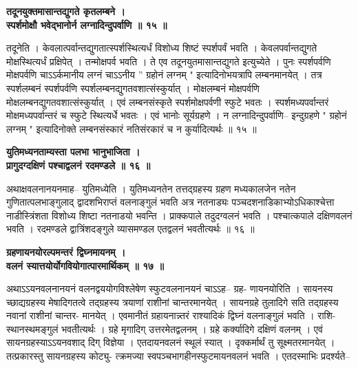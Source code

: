 \documentclass[11pt, openany]{book}
\begin{document}
{{{{\vspace{2mm}
\centering
\textbf{
\hspace{-2.3cm}
 तदूनयुक्तमासान्तद्युगते कृतलम्बने ।\\
 स्पर्शमोक्षौ भवेद्भानोर्न लग्नादिन्दुपर्वाणि ॥ १५ ॥}

\vspace{2mm}
\justifying
 तदूनेति । केवलात्पर्वान्तद्युगतात्स्पर्शस्थित्यर्धं विशोध्य शिष्टं
स्पर्शपर्वं
भवति । केवलपर्वान्तद्युगते मोक्षस्थित्यर्धं प्रक्षिपेत् ।
तन्मोक्षपर्व भवति । ते एव
तदूनयुतमासान्तद्युगते इत्युच्येते । पुनः स्पर्शपर्वणि मोक्षपर्वणि
चाऽऽर्कमानीय
लग्नं चाऽऽनीय '' ग्रहोनं लग्नम् " इत्यादिनोभयत्रापि लम्बनमानयेत् ।
तत्र
स्पर्शलम्बनं स्पर्शपर्वणि स्पर्शलम्बनद्युगतवशात्संस्कुर्यात् ।
मोक्षलम्बनं
मोक्षपर्वणि मोक्षलम्बनद्युगतवशात्संस्कुर्यात् । एवं लम्बनसंस्कृते
स्पर्शमोक्षपर्वणी
स्फुटे भवतः । स्पर्शमध्यपर्वान्तरं  मोक्षमध्यपर्वान्तरं  च
स्फुटे
स्थित्यर्धे भवतः । एवं भानोः सूर्यग्रहणे । न लग्नादिन्दुपर्वाणि--
इन्दुग्रहणे
 " ग्रहोनं लग्नम् " इत्यादिनोक्ते लम्बनसंस्कारं नतिसंरकारं च न कुर्यादित्यर्थः ॥ १५ ॥

\newpage
\thispagestyle{fancy}
\fancyhf{}
\lhead{[ग्रहणाधिकारः]}
\centering
\textbf{
\hspace{-0.5cm}
 युतिमध्यनताम्यस्ता पलभा भानुभाजिता ।\\
 प्रागुदग्दक्षिणं पश्चाद्वलनं रदमण्डले ॥ १६ ॥}

\vspace{2mm}
\justifying
 अथाक्षवलनानयनमाह-- युतिमध्येति । युतिमध्यनतेन तत्तद्ग्रहस्य
ग्रहण
मध्यकालजेन नतेन गुणितात्पलभाङ्गुलाद् द्वादशभिराप्तं वलनाङ्गुलं भवति
अत्र नतनाड्यः पञ्चदशनाडिकाभ्योऽधिकाश्चेत्ता नाडीस्त्रिंशता विशोध्य
शिष्टा
नतनाडयो भवन्ति । प्राक्कपाले तदुदग्वलनं भवति । पश्चात्कपाले
दक्षिणवलनं
भवति । रदमण्डले द्वात्रिंशदङ्गुले व्यासमण्डल एतद्वलनं भवतीत्यर्थः ॥
१६ ॥

\vspace{2mm}
\centering
\textbf{
\hspace{-2cm}
 ग्रहणायनयोरल्पमन्तरं द्विघ्नमायनम् ।\\
 वलनं स्यात्तयोर्योगवियोगात्पारमार्थिकम् ॥ १७ ॥}

\vspace{2mm}
\justifying
 अथाऽऽयनवलनानयनं वलनद्वययोगविश्लेषेण स्फुटवलनानयनं चाऽऽह-- ग्रह-
णायनयोरिति । सायनस्य च्छाद्यग्रहस्य मेषादिगतत्वे तद्ग्रहस्य त्रयाणां
राशीनां
चान्तरमानयेत् । सायनग्रहे तुलादिगे सति तद्ग्रहस्य नवानां राशीनां
चान्तर-
मानयेत् । एवमानीतं ग्रहायनान्न्तरं राश्यादिकं द्विघ्नं वलनाङ्गुलं
भवति । राशि-
स्थानस्थमङ्गुलं भवतीत्यर्थः । ग्रहे मृगादिग् उत्तरमेतद्वलनम् ।
ग्रहे कर्क्यादिगे
दक्षिणं वलनम् । एवं सायनग्रहस्याऽऽयनवशाद् दिग् विज्ञेया ।
एतदायनवलनं
स्थूलं स्यात् । दृक्कर्मार्थं तु सूक्ष्मतरमानयेत् । तत्प्रकारस्तु
सायनग्रहस्य कोट्यु-
त्क्रमज्या स्वपञ्चभागहीनस्फुटमायनवलनं भवति । एतदस्माभिः
प्रदर्श्यते--

}}}}
\end{document}
